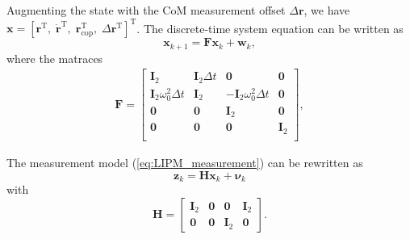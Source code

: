 
Augmenting the state with the CoM measurement offset $\Delta\bm{r}$, we have $\bm{x} = [\bm{r}^\mathrm{T} ,\; \dot{\bm{r}}^\mathrm{T},\; \bm{r}_{\mathrm{cop}}^\mathrm{T} ,\; \Delta\bm{r}^\mathrm{T} ]^\mathrm{T}$. The discrete-time system equation can be written as
\[
\bm{x}_{k+1} = \bm{Fx}_{k} + \bm{w}_{k},
\]
where the matraces
\[
\begin{split}
    \bm{F} =
    \begin{bmatrix}
        \bm{I}_2 & \bm{I}_2\Delta t & \bm{0} & \bm{0} \\
        \bm{I}_2\omega_0^2\Delta t & \bm{I}_2 & -\bm{I}_2 \omega_0^2 \Delta t & \bm{0} \\
        \bm{0} & \bm{0} & \bm{I}_2 & \bm{0} \\
        \bm{0} & \bm{0} & \bm{0} & \bm{I}_2 \\
    \end{bmatrix},
\end{split}
\]

The measurement model (\ref{eq:LIPM_measurement}) can be rewritten as
\[
    \bm{z}_{k} = \bm{H x}_{k} + \bm{\nu}_{k}
\]
with
\[
    \bm{H} = 
    \begin{bmatrix}
        \bm{I}_2 & \bm{0}  & \bm{0} &  \bm{I}_2 \\
        \bm{0} & \bm{0}  & \bm{I}_2 &  \bm{0}
    \end{bmatrix}.
\]